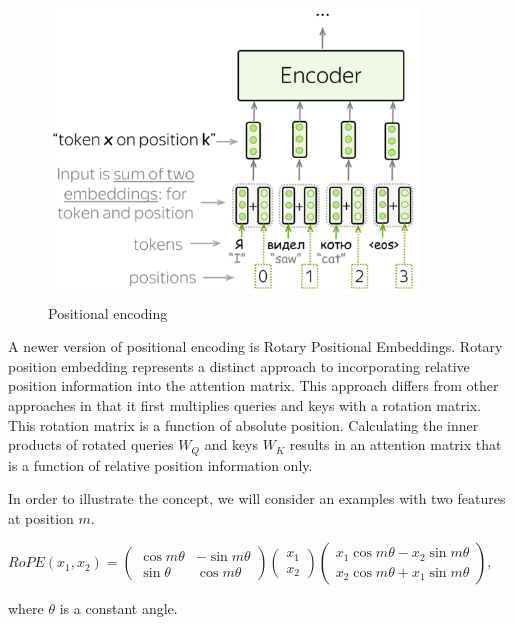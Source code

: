 \documentclass[PMI,VKR]{HSEUniversity}
\begin{document}
\begin{figure}[h]
    \centering
    \includegraphics[scale=1]{img/pos_encoding.png}
    \caption{Positional encoding}
\end{figure}

A newer version of positional encoding is Rotary Positional Embeddings.
Rotary position embedding represents a distinct approach to incorporating relative position information into the attention matrix. 
This approach differs from other approaches in that it first multiplies queries and keys with a rotation matrix. This rotation matrix is a function of absolute position. 
Calculating the inner products of rotated queries $W_Q$ and keys $W_K$ results in an attention matrix that is a function of relative position information only.

In order to illustrate the concept, we will consider an examples with two features at position $m$.
\begin{center}
    $RoPE(x_1, x_2) =   \begin{pmatrix}
                            \cos m\theta & -\sin m\theta\\
                            \sin\theta & \cos m\theta
                        \end{pmatrix} 
                        \begin{pmatrix}
                            x_1 \\
                            x_2
                        \end{pmatrix} 
                        \begin{pmatrix}
                            x_1 \cos m\theta - x_2\sin m\theta\\
                            x_2 \cos m\theta + x_1\sin m\theta
                        \end{pmatrix},
    $
\end{center}
where $\theta$ is a constant angle.
\end{document}
